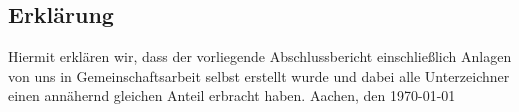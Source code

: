 \documentclass[a4paper, 12pt]{report}
\begin{document}
\begin{flushleft}
%
%
%
%
%
%
%
%


 


 
 \listoffigures
 
%
%
%
%
%
%
%
%
%
%
%
%
%
%
%
%
%

\chapter{Erklärung}
Hiermit erklären wir, dass der vorliegende Abschlussbericht einschließlich Anlagen von uns in Gemeinschaftsarbeit selbst erstellt wurde und dabei alle Unterzeichner einen annähernd gleichen Anteil erbracht haben.\newline \newline
Aachen, den \today
\newline \newline


\end{flushleft}
\end{document}
